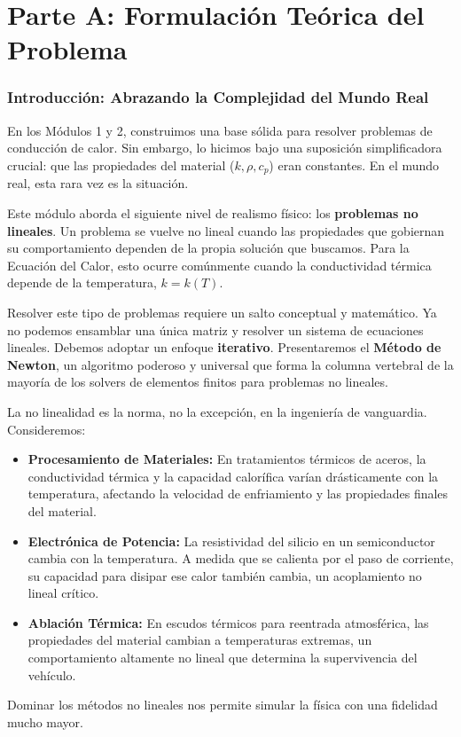\part*{Parte A: Formulación Teórica del Problema}

\section{Introducción: Abrazando la Complejidad del Mundo Real}
En los Módulos 1 y 2, construimos una base sólida para resolver problemas de conducción de calor. Sin embargo, lo hicimos bajo una suposición simplificadora crucial: que las propiedades del material ($k, \rho, c_p$) eran constantes. En el mundo real, esta rara vez es la situación.

Este módulo aborda el siguiente nivel de realismo físico: los \textbf{problemas no lineales}. Un problema se vuelve no lineal cuando las propiedades que gobiernan su comportamiento dependen de la propia solución que buscamos. Para la Ecuación del Calor, esto ocurre comúnmente cuando la conductividad térmica depende de la temperatura, $k = k(T)$.

Resolver este tipo de problemas requiere un salto conceptual y matemático. Ya no podemos ensamblar una única matriz y resolver un sistema de ecuaciones lineales. Debemos adoptar un enfoque \textbf{iterativo}. Presentaremos el \textbf{Método de Newton}, un algoritmo poderoso y universal que forma la columna vertebral de la mayoría de los solvers de elementos finitos para problemas no lineales.

\begin{infobox}
La no linealidad es la norma, no la excepción, en la ingeniería de vanguardia. Consideremos:
\begin{itemize}
    \item \textbf{Procesamiento de Materiales:} En tratamientos térmicos de aceros, la conductividad térmica y la capacidad calorífica varían drásticamente con la temperatura, afectando la velocidad de enfriamiento y las propiedades finales del material.
    \item \textbf{Electrónica de Potencia:} La resistividad del silicio en un semiconductor cambia con la temperatura. A medida que se calienta por el paso de corriente, su capacidad para disipar ese calor también cambia, un acoplamiento no lineal crítico.
    \item \textbf{Ablación Térmica:} En escudos térmicos para reentrada atmosférica, las propiedades del material cambian a temperaturas extremas, un comportamiento altamente no lineal que determina la supervivencia del vehículo.
\end{itemize}
Dominar los métodos no lineales nos permite simular la física con una fidelidad mucho mayor.
\end{infobox}

